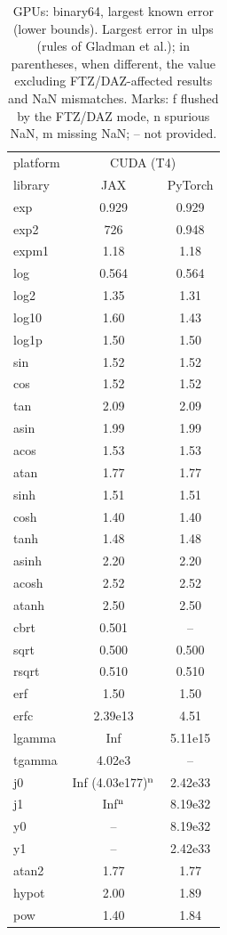 \begin{table}
\centering
\begin{small}
\begin{tabular}{|l|cc|}
\hline
platform & \multicolumn{2}{c|}{CUDA (T4)} \\
library & JAX & PyTorch \\ \hline
exp & 0.929 & 0.929 \\
exp2 & 726 & 0.948 \\
expm1 & 1.18 & 1.18 \\
log & 0.564 & 0.564 \\
log2 & 1.35 & 1.31 \\
log10 & 1.60 & 1.43 \\
log1p & 1.50 & 1.50 \\
sin & 1.52 & 1.52 \\
cos & 1.52 & 1.52 \\
tan & 2.09 & 2.09 \\
asin & 1.99 & 1.99 \\
acos & 1.53 & 1.53 \\
atan & 1.77 & 1.77 \\
sinh & 1.51 & 1.51 \\
cosh & 1.40 & 1.40 \\
tanh & 1.48 & 1.48 \\
asinh & 2.20 & 2.20 \\
acosh & 2.52 & 2.52 \\
atanh & 2.50 & 2.50 \\
cbrt & 0.501 & -- \\
sqrt & 0.500 & 0.500 \\
rsqrt & 0.510 & 0.510 \\
erf & 1.50 & 1.50 \\
erfc & 2.39e13 & 4.51 \\
lgamma & Inf & 5.11e15 \\
tgamma & 4.02e3 & -- \\
j0 & Inf (4.03e177)$^{\rm n}$ & 2.42e33 \\
j1 & Inf$^{\rm n}$ & 8.19e32 \\
y0 & -- & 8.19e32 \\
y1 & -- & 2.42e33 \\
\hline
atan2 & 1.77 & 1.77 \\
hypot & 2.00 & 1.89 \\
pow & 1.40 & 1.84 \\
\hline
\end{tabular}
\end{small}
\caption{GPUs: binary64, largest known error (lower bounds). Largest error in ulps (rules of Gladman et al.); in parentheses, when different, the value excluding FTZ/DAZ-affected results and NaN mismatches. Marks: f flushed by the FTZ/DAZ mode, n spurious NaN, m missing NaN; -- not provided.}
\label{tab:b64gpu}
\end{table}
